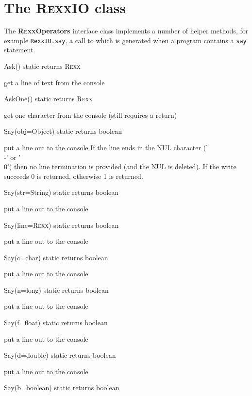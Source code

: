\section{The R\textsc{exx}IO class}\label{refrexxio}
 
The \textbf{R\textsc{exx}Operators} interface class implements a number of helper methods, for example \texttt{RexxIO.say}, a call to which is generated when a program contains a \texttt{say} statement. 

\begin{description}
  \item{Ask() static returns R\textsc{exx}}

get a line of text from the console
  \item {AskOne() static returns R\textsc{exx}}

get one character from the console (still requires a return)
 \item{Say(obj=Object) static returns boolean}

put a line out to the console
    If the line ends in the NUL character ('\\-' or '\\0') then no
    line termination is provided (and the NUL is deleted).
    If the write succeeds 0 is returned, otherwise 1 is returned.
 
  \item{Say(str=String) static returns boolean}

put a line out to the console
  \item{Say(line=R\textsc{exx}) static returns boolean}

put a line out to the console
  \item{Say(c=char) static returns boolean}

put a line out to the console
  \item{Say(n=long) static returns boolean}

put a line out to the console
  \item{Say(f=float)   static returns boolean}

put a line out to the console
  \item{Say(d=double)  static returns boolean}

put a line out to the console
  \item{Say(b=boolean) static returns boolean}


\end{description}

